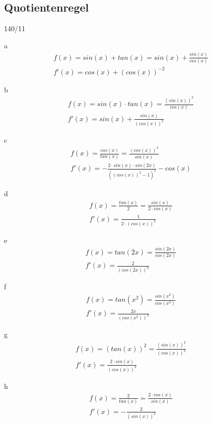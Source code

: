 \subsection{Quotientenregel}
\begin{exercise}{140/11}
  \item [a]
  \begin{gather*}
    f(x) = sin(x) + tan(x) = sin(x) + \frac{sin(x)}{cos(x)} \\
    f'(x) = cos(x) + (cos(x))^{-2}
  \end{gather*}
  \item [b]
  \begin{gather*}
    f(x) = sin(x) \cdot tan(x) = \frac{(sin(x))^2}{cos(x)} \\
    f'(x) = sin(x) + \frac{sin(x)}{(cos(x))^2}
  \end{gather*}
  \item [c]
  \begin{gather*}
    f(x) = \frac{cos(x)}{tan(x)} = \frac{(cos(x))^2}{sin(x)} \\
    f'(x) = -\frac{2 \cdot sin(x) \cdot sin(2x)}{((cos(x))^2 - 1)^2} - cos(x)
  \end{gather*}
  \item [d]
  \begin{gather*}
    f(x) = \frac{tan(x)}{2} = \frac{sin(x)}{2 \cdot cos(x)} \\
    f'(x) = \frac{1}{2 \cdot (cos(x))^2}
  \end{gather*}
  \item [e]
  \begin{gather*}
    f(x) = tan(2x) = \frac{sin(2x)}{cos(2x)} \\
    f'(x) = \frac{2}{(cos(2x))^2}
  \end{gather*}
  \item [f]
  \begin{gather*}
    f(x) = tan(x^2) = \frac{sin(x^2)}{cos(x^2)} \\
    f'(x) = \frac{2x}{(cos(x^2))^2}
  \end{gather*}
  \item [g]
  \begin{gather*}
    f(x) = (tan(x))^2 = \frac{(sin(x))^2}{(cos(x))^2} \\
    f'(x) = \frac{2 \cdot sin(x)}{(cos(x))^3}
  \end{gather*}
  \item [h]
  \begin{gather*}
    f(x) = \frac{2}{tan(x)} = \frac{2 \cdot cos(x)}{sin(x)} \\
    f'(x) = -\frac{2}{(sin(x))^2}
  \end{gather*}
\end{exercise}
